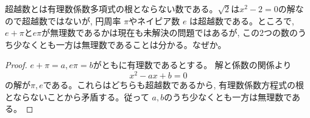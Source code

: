 超越数とは有理数係数多項式の根とならない数である。$\sqrt{2}$は$x^2-2=0$の解なので超越数ではないが, 円周率 $\pi$やネイピア数 $e$ は超越数である。ところで, $e+\pi$と$e\pi$が無理数であるかは現在も未解決の問題ではあるが, この2つの数のうち少なくとも一方は無理数であることは分かる。なぜか。
\enthm
\begin{proof}
$e+\pi=a, e\pi =b$がともに有理数であるとする。 解と係数の関係より
\[x^2-ax+b=0\]
の解が$\pi ,e$である。これらはどちらも超越数であるから, 有理数係数方程式の根とならないことから矛盾する。従って $a,b$のうち少なくとも一方は無理数である。
\end{proof}
